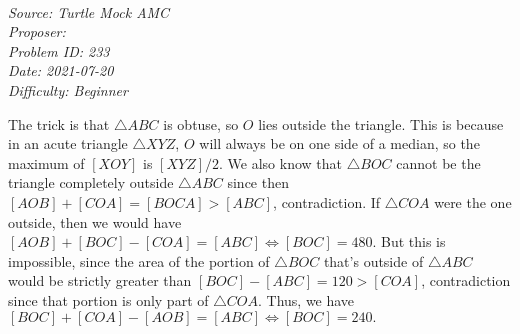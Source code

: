 \SSbreak\\
\emph{Source: Turtle Mock AMC}\\
\emph{Proposer: \Pflame}\\ %
\emph{Problem ID: 233}\\
\emph{Date: 2021-07-20}\\
\emph{Difficulty: Beginner}\\
\SSbreak

\bigskip

\begin{solution}\hfil\medskip
  
	The trick is that $\triangle ABC$ is obtuse, so $O$ lies outside the triangle. 
	This is because in an acute triangle $\triangle XYZ$, $O$ will always be on one side of a median, 
	so the maximum of $[XOY]$ is $[XYZ]/2$. We also know that $\triangle BOC$ cannot be the 
	triangle completely outside $\triangle ABC$ since then $[AOB] + [COA] = [BOCA] > [ABC]$, 
	contradiction. If $\triangle COA$ were the one outside, then we would have 
	$[AOB] + [BOC] - [COA] = [ABC] \iff [BOC] = 480$. But this is impossible, since 
	the area of the portion of $\triangle BOC$ that's outside of $\triangle ABC$ would be 
	strictly greater than $[BOC] - [ABC] = 120 > [COA]$, contradiction since that portion 
	is only part of $\triangle COA$. Thus, we have $[BOC] + [COA] - [AOB] = [ABC] \iff [BOC] = \boxed{240}.$
\end{solution}\bigskip
